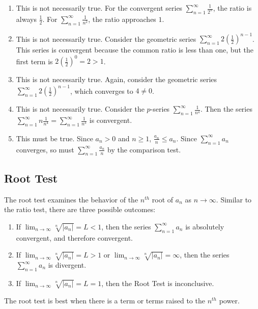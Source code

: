 \begin{Answer}[ref=series2]
\begin{enumerate}
\item This is not necessarily true. For the convergent series
$\sum_{n=1}^\infty \frac{1}{2^n}$, the ratio is always $\frac{1}{2}$. For
$\sum_{n=1}^\infty \frac{1}{n^2}$, the ratio approaches $1$. 
\item This is not necessarily true. Consider the geometric series $\sum_{n=1}
^\infty 2(\frac{1}{2})^{n-1}$. This series is convergent because the common 
ratio is less than one, but the first term is $2(\frac{1}{2})^0 = 2 > 1$. 
\item This is not necessarily true. Again, consider the geometric series 
$\sum_{n=1}^\infty 2(\frac{1}{2})^{n-1}$, which converges to $4 \neq 0$. 
\item This is not necessarily true. Consider the $p$-series $\sum_{n=1}^
\infty \frac{1}{n^4}$. Then the series $\sum_{n=1}^\infty n \frac{1}{n^4} = 
\sum_{n=1}^\infty \frac{1}{n^3}$ is convergent. 
\item This must be true. Since $a_n > 0$ and $n \geq 1$,
$\frac{a_n}{n} \leq a_n$. Since $\sum_{n = 1}^\infty 
a_n$ converges, so must $\sum_{n = 1}^\infty \frac{a_n}{n}$ by the comparison test. 
\end{enumerate}
\end{Answer}

\subsection{Root Test}
The root test examines the behavior of the $n^{th}$ root of 
$a_n$ as $n \to \infty$. Similar to the ratio test, there are three possible 
outcomes:
\begin{enumerate}
\item If $\lim_{n \to \infty} \sqrt[n]{|a_n|} = L < 1$, then the series $\sum
_{n=1}^\infty a_n$ is absolutely convergent, and therefore convergent.
\item If $\lim_{n \to \infty} \sqrt[n]{|a_n|} = L >1$ or $\lim_{n \to \infty} 
\sqrt[n]{|a_n|} = \infty$, then the series $\sum_{n=1}^\infty a_n$ is 
divergent.
\item If $\lim_{n \to \infty} \sqrt[n]{|a_n|} = L = 1$, then the Root Test is 
inconclusive. 
\end{enumerate}

The root test is best when there is a term or terms raised to the $n^{th}$ 
power.

